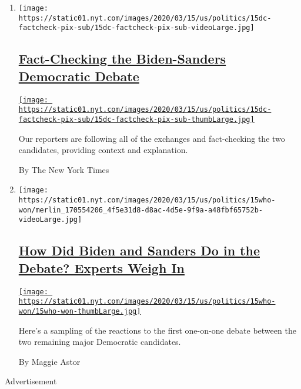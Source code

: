 \begin{enumerate}
\def\labelenumi{\arabic{enumi}.}
\item
  \texttt{[image: https://static01.nyt.com/images/2020/03/15/us/politics/15dc-factcheck-pix-sub/15dc-factcheck-pix-sub-videoLarge.jpg]}

  \hypertarget{fact-checking-the-biden-sanders-democratic-debate}{%
  \subsection{\texorpdfstring{\href{/2020/03/15/us/politics/democratic-debate-fact-check.html}{Fact-Checking
  the Biden-Sanders Democratic
  Debate}}{Fact-Checking the Biden-Sanders Democratic Debate}}\label{fact-checking-the-biden-sanders-democratic-debate}}

  \href{/2020/03/15/us/politics/democratic-debate-fact-check.html}{\texttt{[image: https://static01.nyt.com/images/2020/03/15/us/politics/15dc-factcheck-pix-sub/15dc-factcheck-pix-sub-thumbLarge.jpg]}}

  Our reporters are following all of the exchanges and fact-checking the
  two candidates, providing context and explanation.

  By The New York Times
\item
  \texttt{[image: https://static01.nyt.com/images/2020/03/15/us/politics/15who-won/merlin\_170554206\_4f5e31d8-d8ac-4d5e-9f9a-a48fbf65752b-videoLarge.jpg]}

  \hypertarget{how-did-biden-and-sanders-do-in-the-debate-experts-weigh-in}{%
  \subsection{\texorpdfstring{\href{/2020/03/15/us/politics/who-won-democratic-debate.html}{How
  Did Biden and Sanders Do in the Debate? Experts Weigh
  In}}{How Did Biden and Sanders Do in the Debate? Experts Weigh In}}\label{how-did-biden-and-sanders-do-in-the-debate-experts-weigh-in}}

  \href{/2020/03/15/us/politics/who-won-democratic-debate.html}{\texttt{[image: https://static01.nyt.com/images/2020/03/15/us/politics/15who-won/15who-won-thumbLarge.jpg]}}

  Here's a sampling of the reactions to the first one-on-one debate
  between the two remaining major Democratic candidates.

  By Maggie Astor
\end{enumerate}

Advertisement

